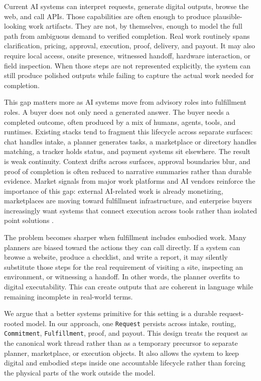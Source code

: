 Current AI systems can interpret requests, generate digital outputs, browse the web, and call APIs. Those capabilities are often enough to produce plausible-looking work artifacts. They are not, by themselves, enough to model the full path from ambiguous demand to verified completion. Real work routinely spans clarification, pricing, approval, execution, proof, delivery, and payout. It may also require local access, onsite presence, witnessed handoff, hardware interaction, or field inspection. When those steps are not represented explicitly, the system can still produce polished outputs while failing to capture the actual work needed for completion.

This gap matters more as AI systems move from advisory roles into fulfillment roles. A buyer does not only need a generated answer. The buyer needs a completed outcome, often produced by a mix of humans, agents, tools, and runtimes. Existing stacks tend to fragment this lifecycle across separate surfaces: chat handles intake, a planner generates tasks, a marketplace or directory handles matching, a tracker holds status, and payment systems sit elsewhere. The result is weak continuity. Context drifts across surfaces, approval boundaries blur, and proof of completion is often reduced to narrative summaries rather than durable evidence. Market signals from major work platforms and AI vendors reinforce the importance of this gap: external AI-related work is already monetizing, marketplaces are moving toward fulfillment infrastructure, and enterprise buyers increasingly want systems that connect execution across tools rather than isolated point solutions \cite{upwork_q4_2025,openai_enterprise_ai_2026,microsoft_frontier_suite_2026}.

The problem becomes sharper when fulfillment includes embodied work. Many planners are biased toward the actions they can call directly. If a system can browse a website, produce a checklist, and write a report, it may silently substitute those steps for the real requirement of visiting a site, inspecting an environment, or witnessing a handoff. In other words, the planner overfits to digital executability. This can create outputs that are coherent in language while remaining incomplete in real-world terms.

We argue that a better systems primitive for this setting is a durable request-rooted model. In our approach, one \texttt{Request} persists across intake, routing, \texttt{Commitment}, \texttt{Fulfillment}, proof, and payout. This design treats the request as the canonical work thread rather than as a temporary precursor to separate planner, marketplace, or execution objects. It also allows the system to keep digital and embodied steps inside one accountable lifecycle rather than forcing the physical parts of the work outside the model.

